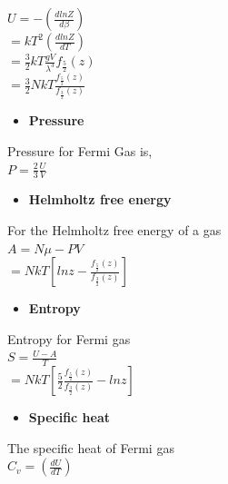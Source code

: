 \documentclass{article}
\newcommand*{\1}{\hspace{1pt}}
\begin{document}
$U=-(\frac{dlnZ}{d \beta})$\\

$ =kT^2(\frac{dlnZ}{dT})$\\

$ = \frac{3}{2}kT\frac{gV}{\lambda^3}f_\frac{5}{2}(z)$\\

$ =\frac{3}{2}NkT\frac{f_\frac{5}{2}(z)}{f_\frac{3}{2}(z)}$\\

\begin{itemize}
    \item \textbf{Pressure}
\end{itemize}


Pressure for Fermi Gas is,\\

$P=\frac{2}{3}\frac{U}{V}$\\
\newpage
\begin{itemize}
    \item \textbf{Helmholtz free energy}
\end{itemize}

For the Helmholtz free energy of a gas\\

$A=N\mu-PV$\\

$ =NkT[{lnz-\frac{f_\frac{5}{2}(z)}{f_\frac{3}{2}(z)}}]$\\


\begin{itemize}
    \item \textbf{Entropy}
\end{itemize}

Entropy for Fermi gas\\

$S=\frac{U-A}{T}$\\

$ =NkT[\frac{5}{2}\frac{f_\frac{5}{2}(z)}{f_\frac{3}{2}(z)}-lnz]$\\

\begin{itemize}
    \item \textbf{Specific heat}
\end{itemize}

The specific heat of Fermi gas\\

$  C_v=(\frac{dU}{dT})$\\
\end{document}
